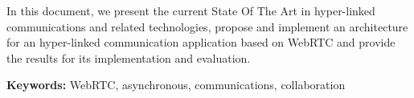 {\color{blue}
In this document, we present the current State Of The Art in hyper-linked communications and related technologies, propose and implement an architecture for an hyper-linked communication application based on \ac{WebRTC} and provide the results for its implementation and evaluation.
}


\vspace{1cm}

\textbf{\Large Keywords:} WebRTC, asynchronous, communications, collaboration


\cleardoublepage
